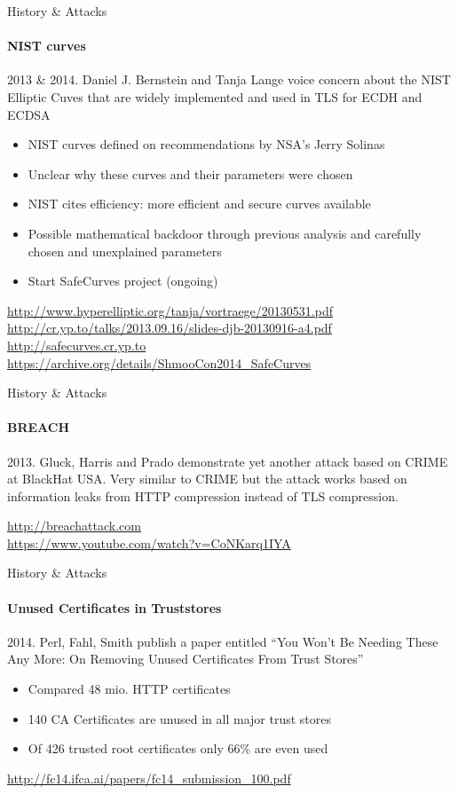 \documentclass[hyperref={draft}]{beamer}
\begin{document}
\begin{frame}{History \& Attacks}
  \framesubtitle{NIST curves}
  2013 \& 2014. Daniel J. Bernstein and Tanja Lange voice concern about the NIST Elliptic Cuves that are widely implemented and used in TLS for ECDH and ECDSA
  \begin{itemize}
    \item NIST curves defined on recommendations by NSA's Jerry Solinas
    \item Unclear why these curves and their parameters were chosen
    \item NIST cites efficiency: more efficient and secure curves available
    \item Possible mathematical backdoor through previous analysis and carefully chosen and unexplained parameters
    \item Start SafeCurves project (ongoing)
  \end{itemize}
  

  \tiny
  \url{http://www.hyperelliptic.org/tanja/vortraege/20130531.pdf}\\
  \url{http://cr.yp.to/talks/2013.09.16/slides-djb-20130916-a4.pdf}\\
  \url{http://safecurves.cr.yp.to}\\
  \url{https://archive.org/details/ShmooCon2014_SafeCurves}
\end{frame}

\begin{frame}{History \& Attacks}
  \framesubtitle{BREACH}
  2013. Gluck, Harris and Prado demonstrate yet another attack based on CRIME at BlackHat USA.
  \newline
  \newline
  Very similar to CRIME but the attack works based on information leaks from HTTP compression instead of TLS compression.
  
  \vspace{80px}

  \tiny
  \url{http://breachattack.com}\\
  \url{https://www.youtube.com/watch?v=CoNKarq1IYA}
\end{frame}

\begin{frame}{History \& Attacks}
  \framesubtitle{Unused Certificates in Truststores}
  2014. Perl, Fahl, Smith publish a paper entitled ``You Won't Be Needing These Any More: On Removing Unused Certificates From Trust Stores''
  \begin{itemize}
    \item Compared 48 mio. HTTP certificates
    \item 140 CA Certificates are unused in all major trust stores
    \item Of 426 trusted root certificates only 66\% are even used
  \end{itemize}

  
  \vspace{70px}

  \tiny
  \url{http://fc14.ifca.ai/papers/fc14_submission_100.pdf}
\end{frame}
\end{document}
